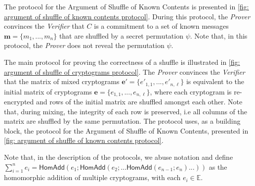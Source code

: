 The protocol for the Argument of Shuffle of Known Contents is presented in \cref{fig: argument of shuffle of known contents protocol}. During this protocol, the \textit{Prover} convinces the \textit{Verifier} that $C$ is a commitment to a set of known messages $\boldsymbol{m} = \{m_1, ..., m_n\}$ that are shuffled by a secret permutation $\psi$. Note that, in this protocol, the \textit{Prover} does not reveal the permutation $\psi$.

The main protocol for proving the correctness of a shuffle is illustrated in \cref{fig: argument of shuffle of cryptograms protocol}. The \textit{Prover} convinces the \textit{Verifier} that the matrix of mixed cryptograms $\boldsymbol{e'} = \{e'_{1,1}, ..., e'_{n,\ell}\}$ is equivalent to the initial matrix of cryptograms $\boldsymbol{e} = \{e_{1,1}, ..., e_{n,\ell}\}$, where each cryptogram is re-encrypted and rows of the initial matrix are shuffled amongst each other. Note that, during mixing, the integrity of each row is preserved, i.e all columns of the matrix are shuffled by the same permutation. The protocol uses, as a building block, the protocol for the Argument of Shuffle of Known Contents, presented in \cref{fig: argument of shuffle of known contents protocol}.

Note that, in the description of the protocols, we abuse notation and define $\sum_{i=1}^n e_i = \mathsf{HomAdd}(e_1; \mathsf{HomAdd}(e_2; ... \mathsf{HomAdd}(e_{n-1}; e_n) ... ))$ as the homomorphic addition of multiple cryptograms, with each $e_i \in \mathbb{E}$.

